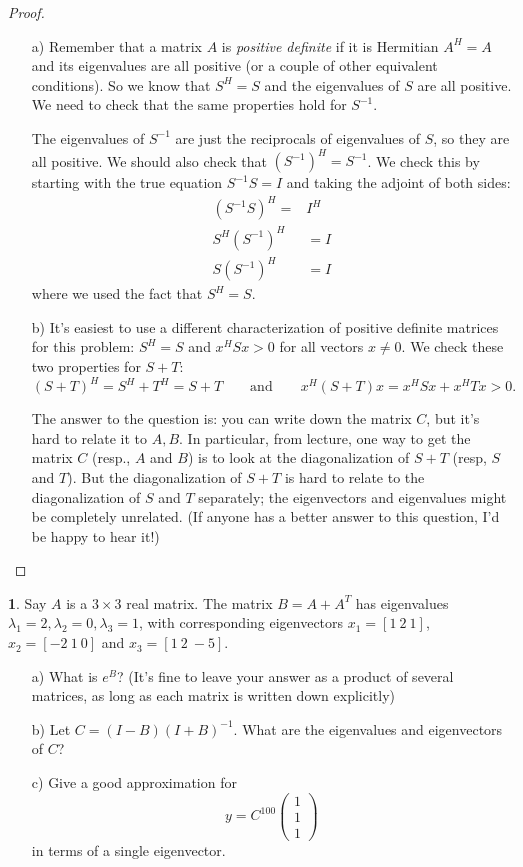 \documentclass{article}
\theoremstyle{definition}
\newtheorem{prob}{}
\begin{document}
\begin{proof}
	\begin{itemize}
		\item[a)] Remember that a matrix $A$ is \emph{positive definite} if it is Hermitian $A^H=A$ and its eigenvalues are all positive (or a couple of other equivalent conditions). So we know that $S^H=S$ and the eigenvalues of $S$ are all positive. We need to check that the same properties hold for $S^{-1}$.
		
		The eigenvalues of $S^{-1}$ are just the reciprocals of eigenvalues of $S$, so they are all positive. We should also check that $(S^{-1})^H= S^{-1}$. We check this by starting with the true equation $S^{-1}S=I$ and taking the adjoint of both sides:
		\begin{align*}
			(S^{-1}S)^H=&I^H\\
			S^H (S^{-1})^H&=I\\
			S (S^{-1})^H&=I
		\end{align*}
	where we used the fact that $S^H=S$. 
	\item[b)] It's easiest to use a different characterization of positive definite matrices for this problem: $S^H=S$ and $x^HSx>0$ for all vectors $x \neq 0$. We check these two properties for $S+T$:
	\[(S+T)^H= S^H + T^H= S+T \qquad \text{and} \qquad x^H(S+T)x=x^HSx + x^HTx >0.\]
	
	The answer to the question is: you can write down the matrix $C$, but it's hard to relate it to $A, B$. In particular, from lecture, one way to get the matrix $C$ (resp., $A$ and $B$) is to look at the diagonalization of $S+T$ (resp, $S$ and $T$). But the diagonalization of $S+T$ is hard to relate to the diagonalization of $S$ and $T$ separately; the eigenvectors and eigenvalues might be completely unrelated. (If anyone has a better answer to this question, I'd be happy to hear it!)
	
	\end{itemize}

\end{proof}

\begin{prob}
	Say $A$ is a $3 \times 3$ real matrix. The matrix $B=A+A^T$ has eigenvalues $\lambda_1=2, \lambda_2=0, \lambda_3=1$, with corresponding eigenvectors $x_1=[1\ 2\ 1]$, $x_2=[-2\ 1\ 0]$ and $x_3=[1 \ 2\ -5]$.
	\begin{itemize}
		\item[a)] What is $e^B$? (It's fine to leave your answer as a product of several matrices, as long as each matrix is written down explicitly)
		\item[b)] Let $C=(I-B)(I+B)^{-1}$. What are the eigenvalues and eigenvectors of $C$?
		\item[c)] Give a good approximation for 
		\[y=C^{100} \begin{pmatrix}
			1\\1\\1
		\end{pmatrix}\]
	in terms of a single eigenvector.
	\end{itemize}
\end{prob}
\end{document}
